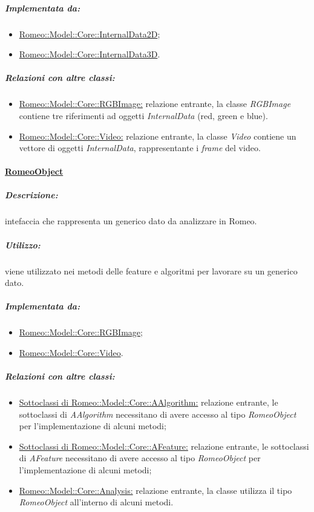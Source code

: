 				\subparagraph{Implementata da:}
					\begin{itemize}
						\item \hyperref[core_internal2d]{Romeo::Model::Core::InternalData2D};
						\item \hyperref[core_internal3d]{Romeo::Model::Core::InternalData3D}.
					\end{itemize}
					
					\subparagraph{Relazioni con altre classi:}
						\begin{itemize}
							\item \hyperref[]{Romeo::Model::Core::RGBImage:} relazione entrante, la classe \textsl{RGBImage} contiene tre riferimenti ad oggetti \textsl{InternalData} (red, green e blue).
									
							\item \hyperref[]{Romeo::Model::Core::Video:} relazione entrante, la classe \textsl{Video} contiene un vettore di oggetti \textsl{InternalData}, rappresentante i \emph{frame} del video.
							 
						\end{itemize}
					
				\paragraph{\underline{RomeoObject}}
				\label{romeoobject}
					
					\subparagraph{Descrizione:} intefaccia che rappresenta un generico dato da analizzare in Romeo\g{}.
					
					\subparagraph{Utilizzo:} viene utilizzato nei metodi delle feature e algoritmi per lavorare su un generico dato.
					
					\subparagraph{Implementata da:}
						\begin{itemize}
							\item \hyperref[]{Romeo::Model::Core::RGBImage};
							\item \hyperref[]{Romeo::Model::Core::Video}.
						\end{itemize}
					
				\subparagraph{Relazioni con altre classi:}
					\begin{itemize}				
						\item \hyperref[]{Sottoclassi di Romeo::Model::Core::AAlgorithm:} relazione entrante, 
						le sottoclassi di \textsl{AAlgorithm} necessitano di avere accesso al tipo \textsl{RomeoObject} per l'implementazione di alcuni metodi;
						
						\item \hyperref[]{Sottoclassi di Romeo::Model::Core::AFeature:} relazione entrante, le sottoclassi di \textsl{AFeature} necessitano di avere accesso al tipo \textsl{RomeoObject} per l'implementazione di alcuni metodi;
						
						\item \hyperref[]{Romeo::Model::Core::Analysis:} relazione entrante, la classe \textsl{
						} utilizza il tipo \textsl{RomeoObject} all'interno di alcuni metodi.
					\end{itemize}
		
